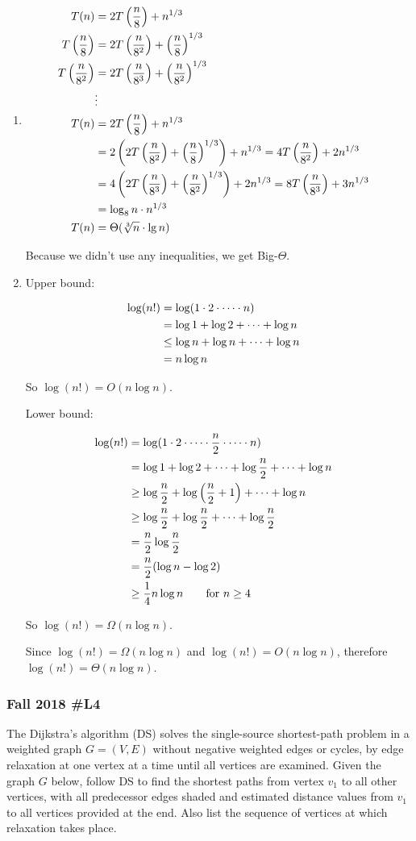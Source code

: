 \begin{enumerate}[label=\alph*.]

\item 
\begin{align*}
	 T(n) &= 2T\left(\frac{n}{8} \right) + n^{1/3} \cr
	 T\left( \frac{n}{8} \right) &= 2T\left(\frac{n}{8^2} \right) + \left(\frac{n}{8}\right)^{1/3} \cr
	 T\left( \frac{n}{8^2} \right) &= 2T\left(\frac{n}{8^3} \right) + \left(\frac{n}{8^2}\right)^{1/3} \cr
	 &\vdots \cr	 
	 T(n) &= 2T\left(\frac{n}{8} \right) + n^{1/3} \cr
	 &= 2\left(2T\left(\frac{n}{8^2} \right) + \left(\frac{n}{8}\right)^{1/3}  \right) + n^{1/3} = 4T\left(\frac{n}{8^2} \right) + 2n^{1/3} \cr
	 &= 4 \left( 2T\left(\frac{n}{8^3} \right) + \left(\frac{n}{8^2}\right)^{1/3} \right) + 2n^{1/3} =  8T\left(\frac{n}{8^3} \right) + 3n^{1/3}\cr
	 &= \log_8 n \cdot n^{1/3}\cr
	 T(n) &= \Theta(\root 3 \of n \cdot \lg n) \cr
\end{align*}

Because we didn't use any inequalities, we get Big-$\Theta$.  

\item Upper bound:

\begin{align*}
	\log(n!) &= \log(1 \cdot 2 \cdot \cdots \cdot n) \cr
		&= \log 1 + \log 2 + \cdots + \log n \cr
		&\le \log n + \log n + \cdots + \log n \cr
		&= n \log n \cr
\end{align*}

So $\log(n!) = O(n \log n)$.  
	
Lower bound:

\begin{align*}
	\log(n!) &=\log(1 \cdot 2 \cdot \cdots \cdot \frac{n}{2} \cdot \cdots \cdot n) \cr
		&= \log 1 + \log 2 + \cdots + \log \frac{n}{2} + \cdots + \log n\cr
		&\ge \log \frac{n}{2} + \log \left( \frac{n}{2} + 1 \right) + \cdots + \log n \cr
		&\ge \log \frac{n}{2} + \log \frac{n}{2} + \cdots + \log \frac{n}{2} \cr
		&= \frac{n}{2} \log \frac{n}{2} \cr
		&= \frac{n}{2} ( \log n - \log 2) \cr
		&\ge \frac{1}{4} n \log n \text{\qquad for } n\ge 4 \cr
\end{align*}

So $\log(n!) = \Omega(n \log n)$.  

Since $\log(n!) = \Omega(n \log n)$ and $\log(n!) = O(n \log n)$, therefore $\log(n!) = \Theta(n \log n)$.  

\end{enumerate}
	
\subsubsection{Fall 2018 \#L4}
	The Dijkstra's algorithm (DS) solves the single-source shortest-path problem in a weighted graph $G = (V,E)$ without negative weighted edges or cycles, by edge relaxation at one vertex at a time until all vertices are examined.  Given the graph $G$ below, follow DS to find the shortest paths from vertex $v_1$ to all other vertices, with all predecessor edges shaded and estimated distance values from $v_1$ to all vertices provided at the end.  Also list the sequence of vertices at which relaxation takes place.  
	
